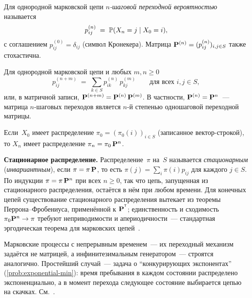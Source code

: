 \begin{definition}
\label{def:n-step-transition}
Для однородной марковской цепи \emph{$n$-шаговой переходной вероятностью} называется
\[
  p_{ij}^{(n)} \;=\; \mathbb{P}(X_n = j \mid X_0 = i),
\]
с соглашением $p_{ij}^{(0)} = \delta_{ij}$ (символ Кронекера). Матрица $\mathbf{P}^{(n)} = (p_{ij}^{(n)})_{i,j \in S}$ также стохастична.
\end{definition}

\begin{theorem}
\label{thm:kolmogorov-chapman}
Для однородной марковской цепи и любых $m, n \geq 0$
\[
  p_{ij}^{(n + m)} \;=\; \sum_{k \in S} p_{ik}^{(n)}\, p_{kj}^{(m)} \qquad \text{для всех } i, j \in S,
\]
или, в матричной записи, $\mathbf{P}^{(n+m)} = \mathbf{P}^{(n)}\, \mathbf{P}^{(m)}$. В частности, $\mathbf{P}^{(n)} = \mathbf{P}^n$~--- матрица $n$-шаговых переходов является $n$-й степенью одношаговой переходной матрицы.
\end{theorem}

\begin{corollary}
\label{cor:distribution-at-n}
Если~$X_0$ имеет распределение $\pi_0 = (\pi_0(i))_{i \in S}$ (записанное вектор-строкой), то $X_n$ имеет распределение $\pi_n = \pi_0\, \mathbf{P}^n$.
\end{corollary}

\medskip
\noindent\textbf{Стационарное распределение.} Распределение~$\pi$ на~$S$ называется \emph{стационарным} (\emph{инвариантным}), если $\pi = \pi\, \mathbf{P}$, то есть $\pi(j) = \sum_i \pi(i) p_{ij}$ для каждого $j \in S$. По индукции $\pi = \pi\, \mathbf{P}^n$ при всех $n \geq 0$, так что цепь, запущенная из стационарного распределения, остаётся в нём при любом времени. Для конечных цепей существование стационарного распределения вытекает из теоремы Перрона--Фробениуса, применённой к $\mathbf{P}^{^{\mathsf{T}}}$; единственность и сходимость $\pi_0 \mathbf{P}^n \to \pi$ требуют неприводимости и апериодичности~--- стандартная эргодическая теорема для марковских цепей~\cite[гл.~VIII]{Shiryaev1989}.

\begin{remark}
Марковские процессы с непрерывным временем~--- их переходный механизм задаётся не матрицей, а инфинитезимальным генератором~--- строятся аналогично. Простейший случай~--- задача о ``конкурирующих экспонентах'' (\cref{prob:exponential-min}): время пребывания в каждом состоянии распределено экспоненциально, а в момент перехода следующее состояние выбирается цепью на скачках. См.~\cite[гл.~VIII]{Sevastyanov1982}.
\end{remark}

